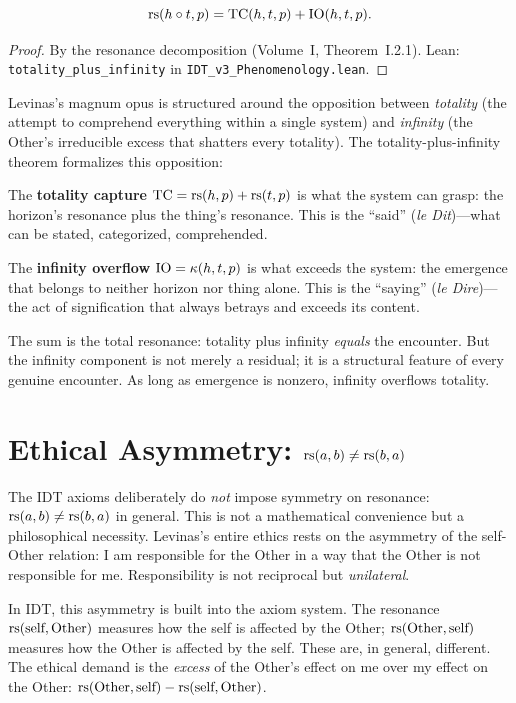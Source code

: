 \begin{theorem}
\label{thm:totality-infinity}
\[
\mathrm{rs}(h \circ t, p) = \mathrm{TC}(h, t, p) + \mathrm{IO}(h, t, p).
\]
\end{theorem}

\begin{proof}
By the resonance decomposition (Volume~I, Theorem~I.2.1).
Lean: \texttt{totality\_plus\_infinity} in \texttt{IDT\_v3\_Phenomenology.lean}.
\end{proof}

\begin{interpretation}
\label{interp:totality-infinity}
Levinas's magnum opus is structured around the opposition between
\emph{totality} (the attempt to comprehend everything within a single system)
and \emph{infinity} (the Other's irreducible excess that shatters every
totality). The totality-plus-infinity theorem formalizes this opposition:

The \textbf{totality capture} $\mathrm{TC} = \mathrm{rs}(h,p) + \mathrm{rs}(t,p)$ is what
the system can grasp: the horizon's resonance plus the thing's resonance.
This is the ``said'' (\textit{le Dit})---what can be stated, categorized,
comprehended.

The \textbf{infinity overflow} $\mathrm{IO} = \kappa(h, t, p)$ is what
exceeds the system: the emergence that belongs to neither horizon nor thing
alone. This is the ``saying'' (\textit{le Dire})---the act of signification
that always betrays and exceeds its content.

The sum is the total resonance: totality plus infinity \emph{equals} the
encounter. But the infinity component is not merely a residual; it is a
structural feature of every genuine encounter. As long as emergence is nonzero,
infinity overflows totality.
\end{interpretation}

\section{Ethical Asymmetry: $\mathrm{rs}(a,b) \neq \mathrm{rs}(b,a)$}

\begin{remark}
\label{rem:asymmetry}
The IDT axioms deliberately do \emph{not} impose symmetry on resonance:
$\mathrm{rs}(a, b) \neq \mathrm{rs}(b, a)$ in general. This is not a mathematical convenience
but a philosophical necessity. Levinas's entire ethics rests on the asymmetry
of the self-Other relation: I am responsible for the Other in a way that the
Other is not responsible for me. Responsibility is not reciprocal but
\emph{unilateral}.

In IDT, this asymmetry is built into the axiom system. The resonance
$\mathrm{rs}(\text{self}, \text{Other})$ measures how the self is affected by the
Other; $\mathrm{rs}(\text{Other}, \text{self})$ measures how the Other is affected by
the self. These are, in general, different. The ethical demand is the
\emph{excess} of the Other's effect on me over my effect on the Other:
$\mathrm{rs}(\text{Other}, \text{self}) - \mathrm{rs}(\text{self}, \text{Other})$.
\end{remark}

